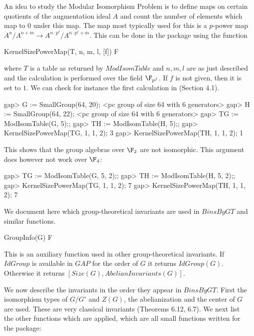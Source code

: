 \endexample


An idea to study the Modular Isomorphism Problem is to define maps on certain
quotients of the augmentation ideal $A$ and count the number of elements which map
to $0$ under this map. The map most typically used for this is a $p$-power map
$A^n/A^{n+m} \rightarrow A^{n \cdot p^\ell}/A^{n \cdot p^\ell + m}$. This can 
be done in the package using the function

\> KernelSizePowerMap(T, n, m, l, [f]) F

where $T$ is a table as returned by $ModIsomTable$ and $n, m, l$ are as 
just described and the calculation is performed over the field $\F_{p^f}$.
If $f$ is not given, then it is set to $1$.
We can check for instance the first calculation in \cite{HS06}(Section 4.1).

\beginexample
gap> G := SmallGroup(64, 20);
<pc group of size 64 with 6 generators>
gap> H := SmallGroup(64, 22);
<pc group of size 64 with 6 generators>
gap> TG := ModIsomTable(G, 5);;
gap> TH := ModIsomTable(H, 5);;
gap> KernelSizePowerMap(TG, 1, 1, 2);
3
gap> KernelSizePowerMap(TH, 1, 1, 2);
1
\endexample

This shows that the group algebras over $\F_2$ are not isomorphic. This 
argument does however not work over $\F_4$:

\beginexample
gap> TG := ModIsomTable(G, 5, 2);;
gap> TH := ModIsomTable(H, 5, 2);;
gap> KernelSizePowerMap(TG, 1, 1, 2);
7
gap> KernelSizePowerMap(TH, 1, 1, 2);
7
\endexample


We document here which group-theoretical invariants are used in $BinsByGT$ and 
similar functions.

\> GroupInfo(G) F

This is an auxiliary function used in other group-theoretical invariants. 
If $IdGroup$ is available in $GAP$ for the order of $G$ it returns $IdGroup(G)$.
Otherwise it returns $[Size(G), AbelianInvariants(G)]$. 

We now describe the invariants in the order they appear in $BinsByGT$. 
First the isomorphism types of $G/G'$ and $Z(G)$, the abelianization and the center
of $G$ are used. These are very classical invariants \cite{San85}(Theorems 6.12, 6.7).
We next list the other functions which are applied, which are all small functions written 
for the package:

